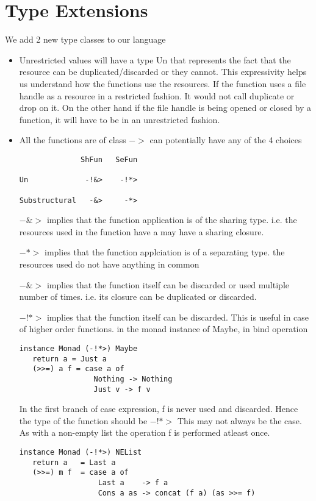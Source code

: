 \chapter{Type Extensions}

We add 2 new type classes to our language
\begin{itemize}
\item Unrestricted values will have a type Un
  that represents the fact that the resource can be
  duplicated/discarded or they cannot.
  This expressivity helps us understand how the functions
  use the resources. If the function uses a file handle as a resource
  in a restricted fashion. It would not call duplicate or drop on it.
  On the other hand if the file handle is being opened or closed
  by a function, it will have to be in an unrestricted fashion.
\item All the functions are of class $->$ can potentially have any of the 4 choices
\begin{verbatim}
              ShFun   SeFun

Un             -!&>    -!*>

Substructural   -&>     -*>
\end{verbatim}
  $-\&>$ implies that the function application is of the sharing type.
  i.e. the resources used in the function have a may have a sharing closure.

  $-*>$ implies that the function applciation is of a separating type.
  the resources used do not have anything in common

  $-\!\&>$ implies that the function itself can be discarded
  or used multiple number of times. i.e. its closure
  can be duplicated or discarded.

  $-!*>$ implies that the function itself can be discarded.
  This is useful in case of higher order functions. in the monad instance
  of Maybe, in bind operation

\begin{lstlisting}
instance Monad (-!*>) Maybe
   return a = Just a
   (>>=) a f = case a of
                 Nothing -> Nothing
                 Just v -> f v
\end{lstlisting}

  In the first branch of case expression, f is never used and discarded. Hence
  the type of the function should be $-!*>$
  This may not always be the case. As with a non-empty list
  the operation f is performed atleast once.

\begin{lstlisting}
instance Monad (-!*>) NEList
   return a   = Last a
   (>>=) m f  = case a of
                  Last a    -> f a
                  Cons a as -> concat (f a) (as >>= f)
\end{lstlisting}

\end{itemize}


